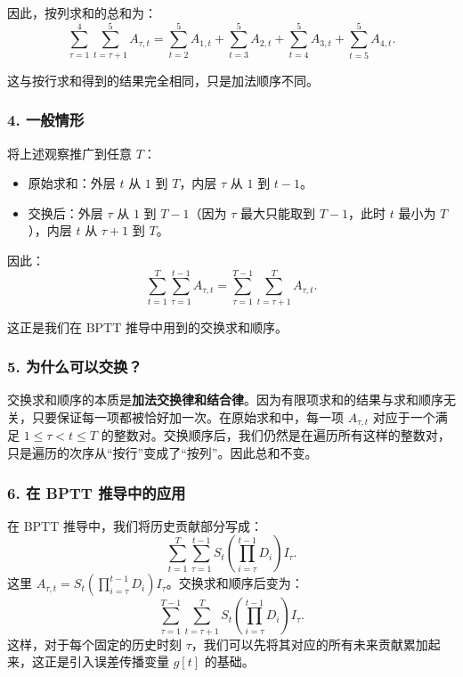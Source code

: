 \documentclass[journal,12pt,onecolumn]{IEEEtran}
\begin{document}
因此，按列求和的总和为：
\[
\sum_{\tau=1}^{4} \sum_{t=\tau+1}^{5} A_{\tau,t}
=
\sum_{t=2}^{5} A_{1,t} + \sum_{t=3}^{5} A_{2,t} + \sum_{t=4}^{5} A_{3,t} + \sum_{t=5}^{5} A_{4,t}.
\]

这与按行求和得到的结果完全相同，只是加法顺序不同。

\subsubsection*{4. 一般情形}

将上述观察推广到任意 \(T\)：
\begin{itemize}
    \item 原始求和：外层 \(t\) 从 \(1\) 到 \(T\)，内层 \(\tau\) 从 \(1\) 到 \(t-1\)。
    \item 交换后：外层 \(\tau\) 从 \(1\) 到 \(T-1\)（因为 \(\tau\) 最大只能取到 \(T-1\)，此时 \(t\) 最小为 \(T\)），内层 \(t\) 从 \(\tau+1\) 到 \(T\)。
\end{itemize}

因此：
\begin{equation}
\sum_{t=1}^T \sum_{\tau=1}^{t-1} A_{\tau,t}
=
\sum_{\tau=1}^{T-1} \sum_{t=\tau+1}^{T} A_{\tau,t}.
\end{equation}

这正是我们在 BPTT 推导中用到的交换求和顺序。

\subsubsection*{5. 为什么可以交换？}

交换求和顺序的本质是\textbf{加法交换律和结合律}。因为有限项求和的结果与求和顺序无关，只要保证每一项都被恰好加一次。在原始求和中，每一项 \(A_{\tau,t}\) 对应于一个满足 \(1 \le \tau < t \le T\) 的整数对。交换顺序后，我们仍然是在遍历所有这样的整数对，只是遍历的次序从“按行”变成了“按列”。因此总和不变。

\subsubsection*{6. 在 BPTT 推导中的应用}

在 BPTT 推导中，我们将历史贡献部分写成：
\[
\sum_{t=1}^T \sum_{\tau=1}^{t-1} S_t \left( \prod_{i=\tau}^{t-1} D_i \right) I_\tau.
\]
这里 \(A_{\tau,t} = S_t \left( \prod_{i=\tau}^{t-1} D_i \right) I_\tau\)。交换求和顺序后变为：
\[
\sum_{\tau=1}^{T-1} \sum_{t=\tau+1}^{T} S_t \left( \prod_{i=\tau}^{t-1} D_i \right) I_\tau.
\]
这样，对于每个固定的历史时刻 \(\tau\)，我们可以先将其对应的所有未来贡献累加起来，这正是引入误差传播变量 \(g[t]\) 的基础。





\end{document}
